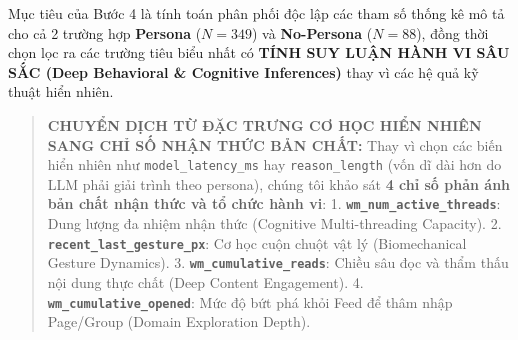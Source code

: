\documentclass[11pt]{article}
\begin{document}
Mục tiêu của Bước 4 là tính toán phân phối độc lập các tham số thống kê
mô tả cho cả 2 trường hợp \textbf{Persona} (\(N=349\)) và
\textbf{No-Persona} (\(N=88\)), đồng thời chọn lọc ra các trường tiêu
biểu nhất có \textbf{TÍNH SUY LUẬN HÀNH VI SÂU SẮC (Deep Behavioral \&
Cognitive Inferences)} thay vì các hệ quả kỹ thuật hiển nhiên.

\begin{quote}
\textbf{CHUYỂN DỊCH TỪ ĐẶC TRƯNG CƠ HỌC HIỂN NHIÊN SANG CHỈ SỐ NHẬN THỨC
BẢN CHẤT:} Thay vì chọn các biến hiển nhiên như
\texttt{model\_latency\_ms} hay \texttt{reason\_length} (vốn dĩ dài hơn
do LLM phải giải trình theo persona), chúng tôi khảo sát \textbf{4 chỉ
số phản ánh bản chất nhận thức và tổ chức hành vi}: 1.
\textbf{\texttt{wm\_num\_active\_threads}}: Dung lượng đa nhiệm nhận
thức (Cognitive Multi-threading Capacity). 2.
\textbf{\texttt{recent\_last\_gesture\_px}}: Cơ học cuộn chuột vật lý
(Biomechanical Gesture Dynamics). 3.
\textbf{\texttt{wm\_cumulative\_reads}}: Chiều sâu đọc và thẩm thấu nội
dung thực chất (Deep Content Engagement). 4.
\textbf{\texttt{wm\_cumulative\_opened}}: Mức độ bứt phá khỏi Feed để
thâm nhập Page/Group (Domain Exploration Depth).
\end{quote}
\end{document}
